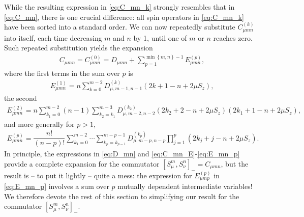 \documentclass[aps,notitlepage,nofootinbib,11pt]{revtex4-1}
\newcommand{\f}[2]{\dfrac{#1}{#2}} %
\newcommand{\p}[1]{\left(#1\right)} %
\renewcommand{\sp}[1]{\left[#1\right]} %
\renewcommand{\set}[1]{\left\{#1\right\}} %
\newcommand{\1}{\mathds{1}}
\begin{document}
While the resulting expression in \eqref{eq:C_mn_k} strongly resembles
that in \eqref{eq:C_mn}, there is one crucial difference: all spin
operators in \eqref{eq:C_mn_k} have been sorted into a standard order.
We can now repeatedly substitute $C_{\mu mn}^{(k)}$ into itself, each
time decreasing $m$ and $n$ by 1, until one of $m$ or $n$ reaches
zero.  Such repeated substitution yields the expansion
\begin{align}
  C_{\mu mn}
  = C_{\mu mn}^{(0)}
  = D_{\mu mn}
  + \sum_{p=1}^{\min\set{m,n}-1} E_{\mu mn}^{(p)},
  \label{eq:C_mn_E}
\end{align}
where the first terms in the sum over $p$ is
\begin{align}
  E_{\mu mn}^{(1)}
  = n \sum_{k=0}^{m-2} D_{\mu,m-1,n-1}^{(k)}
  \p{2k+1-n+2\mu S_z},
\end{align}
the second
\begin{align}
  E_{\mu mn}^{(2)}
  = n \sum_{k_1=0}^{m-2} \p{n-1} \sum_{k_2=k_1}^{m-3}
  D_{\mu,m-2,n-2}^{(k_2)}
  \p{2k_2+2-n+2\mu S_z} \p{2k_1+1-n+2\mu S_z},
\end{align}
and more generally for $p>1$,
\begin{align}
  E_{\mu mn}^{(p)}
  = \f{n!}{\p{n-p}!}
  \sum_{k_1=0}^{m-2}\cdots\sum_{k_p=k_{p-1}}^{m-p-1}
  D_{\mu,m-p,n-p}^{(k_p)} \prod_{j=1}^p \p{2k_j+j-n+2\mu S_z}.
  \label{eq:E_mn_p}
\end{align}
In principle, the expressions in \eqref{eq:D_mn} and
\eqref{eq:C_mn_E}-\eqref{eq:E_mn_p} provide a complete expansion for
the commutator $\sp{S_\mu^m,S_\nu^n}_- = C_{\mu mn}$, but the result
is -- to put it lightly -- quite a mess: the expression for
$E_{\mu mp}^{(p)}$ in \eqref{eq:E_mn_p} involves a sum over $p$
mutually dependent intermediate variables!  We therefore devote the
rest of this section to simplifying our result for the commutator
$\sp{S_\mu^m,S_\nu^n}_-$.
\end{document}
